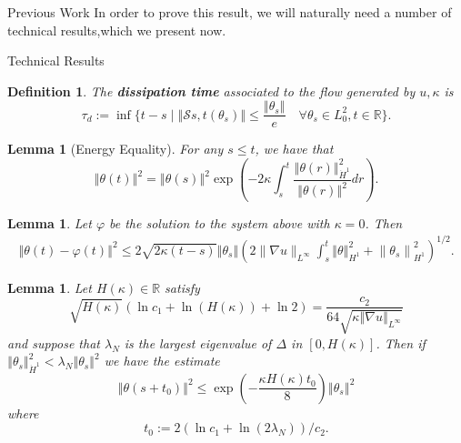 \documentclass[final,noamsthm]{beamer}
\newtheorem{defn}[ex]{Definition}
\newtheorem{lemma}[ex]{Lemma}
\newcommand{\R}{\mathbb{R}}
\renewcommand{\phi}{\varphi}
\def\st{\;\vert\;}
\newcommand{\norm}[1]{\left\Vert #1\right\Vert}
\newlength{\colwidth}
\begin{document}
\begin{frame}[t]
\begin{columns}[t]
\begin{column}{\colwidth}
\begin{block}{Previous Work}
                In order to prove this result, we will naturally need a number of technical results,which we present now.
            \end{block}


\begin{block}{Technical Results}
\begin{defn}
		The \textbf{dissipation time} associated to the flow generated by $u, \kappa$ is
		\[
			\tau_d := \inf \{t-s \st \norm{\mathcal{S}{s,t}(\theta_s)} \le \dfrac{\norm {\theta_s}}{e} \quad \forall \theta_s \in L^2_0, t \in \R\}.
		\]
	\end{defn}
	\begin{lemma}[Energy Equality]
		For any $s \le t$, we have that
		\[
			\norm{\theta(t)}^2
			=\norm{\theta(s)}^2 \exp \left(-2 \kappa \int_s^t\dfrac{\norm{\theta(r)}^2_{\dot H^1}}{\norm{\theta(r)}^2} dr\right).
		\]
	\end{lemma}
	\begin{lemma}
		Let $\phi$ be the solution to the system above with $\kappa = 0$.
		Then
		\begin{align*}
			\norm{\theta(t)-\phi(t)}^{2} \leqslant 2 \sqrt{2 \kappa(t-s)}\norm{\theta_{s}}\left(2\|\nabla u\|_{L^{\infty}} \int_{s}^{t}\norm{\theta}_{H^{1}}^{2} +\left\|\theta_{s}\right\|_{H^{1}}^{2}\right)^{1 / 2} .
		\end{align*}
	\end{lemma}
	\begin{lemma}
		Let $H(\kappa) \in \R$ satisfy
		\[
			\sqrt{H(\kappa)} (\ln c_1 + \ln(H(\kappa)) + \ln 2) = \dfrac{c_2}{64 \sqrt{\kappa\norm{\nabla u}_{L^\infty}}}
		\]
		and suppose that $\lambda_N$ is the largest eigenvalue of $\Delta$ in $[0,H(\kappa)]$.
		Then if
		\(
		\norm{\theta_{s}}_{\dot H^1}^{2}<\lambda_{N}\norm{\theta_{s}}^{2}
		\)
		we have the estimate
		\[
			\norm{\theta\left(s+ t_0\right)}^{2} \le\exp \left(-\frac{\kappa H(\kappa) t_0}{8}\right)\norm{\theta_{s}}^{2}
		\]
		where
		\[
			t_0 := 2\left(\ln c_1+\ln\left({2\lambda_N}\right)\right)/{c_2}.
		\]
	\end{lemma}



            \end{block}


            
        \end{column}




\end{columns}
\end{frame}
\end{document}
